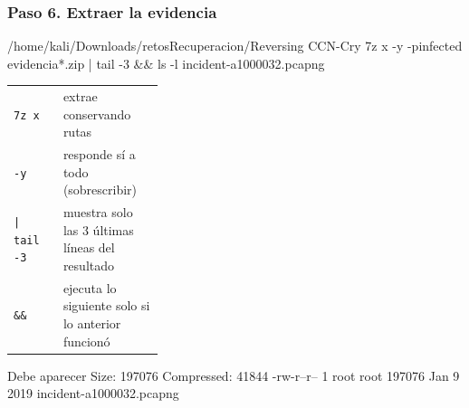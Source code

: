 \documentclass[11pt,a4paper]{article}
\begin{document}
\subsubsection*{Paso 6. Extraer la evidencia}
\begin{comando}{/home/kali/Downloads/retosRecuperacion/Reversing CCN-Cry}
7z x -y -pinfected evidencia*.zip | tail -3 && ls -l incident-a1000032.pcapng
\end{comando}
\begin{tcolorbox}[enhanced, breakable, colback=gray!3, colframe=gray!35, boxrule=0.3pt, arc=1pt, left=4pt, right=4pt, top=2pt, bottom=2pt, fonttitle=\sffamily\scriptsize\bfseries, coltitle=black!70, colbacktitle=gray!10, title={Qué hace cada parte}, attach title to upper, before skip=2pt, after skip=4pt, fontupper=\small]
\par{\renewcommand{\arraystretch}{1.12}\begin{tabularx}{\linewidth}{@{}>{\raggedright\arraybackslash}p{0.33\linewidth}>{\raggedright\arraybackslash}X@{}}
\texttt{7z x} & extrae conservando rutas \\
\texttt{-y} & responde sí a todo (sobrescribir) \\
\texttt{|\allowbreak{} tail -3} & muestra solo las 3 últimas líneas del resultado \\
\texttt{\&\&} & ejecuta lo siguiente solo si lo anterior funcionó \\
\end{tabularx}}
\end{tcolorbox}
\begin{salida}{Debe aparecer}
Size:       197076
Compressed: 41844
-rw-r--r-- 1 root root 197076 Jan  9  2019 incident-a1000032.pcapng
\end{salida}
\end{document}
